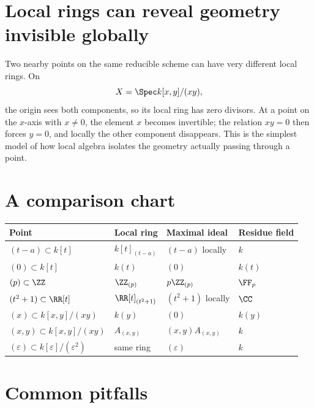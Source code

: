 \section{Local rings can reveal geometry invisible globally}

Two nearby points on the same reducible scheme can have very different local rings.  On
\[
X=\Spec k[x,y]/(xy),
\]
the origin sees both components, so its local ring has zero divisors.  At a point on the
$x$-axis with $x\neq0$, the element $x$ becomes invertible; the relation $xy=0$ then forces
$y=0$, and locally the other component disappears.  This is the simplest model of how local
algebra isolates the geometry actually passing through a point.



\section{A comparison chart}

\begin{center}
\small
\renewcommand{\arraystretch}{1.25}
\begin{tabular}{p{}p{}p{}p{}}
\toprule
Point & Local ring & Maximal ideal & Residue field\\
\midrule
$(t-a)\subset k[t]$ & $k[t]_{(t-a)}$ & $(t-a)$ locally & $k$\\
$(0)\subset k[t]$ & $k(t)$ & $(0)$ & $k(t)$\\
$(p)\subset\ZZ$ & $\ZZ_{(p)}$ & $p\ZZ_{(p)}$ & $\FF_p$\\
$(t^2+1)\subset\RR[t]$ & $\RR[t]_{(t^2+1)}$ & $(t^2+1)$ locally & $\CC$\\
$(x)\subset k[x,y]/(xy)$ & $k(y)$ & $(0)$ & $k(y)$\\
$(x,y)\subset k[x,y]/(xy)$ & $A_{(x,y)}$ & $(x,y)A_{(x,y)}$ & $k$\\
$(\varepsilon)\subset k[\varepsilon]/(\varepsilon^2)$ & same ring & $(\varepsilon)$ & $k$\\
\bottomrule
\end{tabular}
\end{center}

\section{Common pitfalls}

